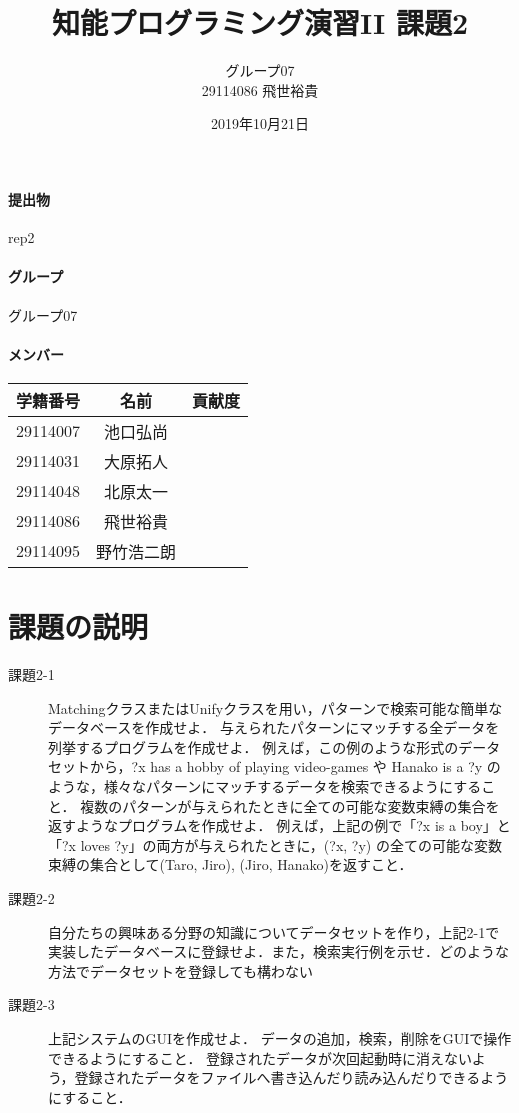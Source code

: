 \documentclass[a4j]{jarticle}
\title{知能プログラミング演習II 課題2}
\author{グループ07\\
  29114086 飛世裕貴\\
}
\date{2019年10月21日}
\begin{document}
\maketitle

\paragraph{提出物} rep2
\paragraph{グループ} グループ07
\paragraph{メンバー}
\begin{tabular}{|c|c|c|}
  \hline\hline
  学籍番号&名前&貢献度\\
  \hline\hline
  29114007&池口弘尚&\\
  \hline
  29114031&大原拓人&\\
  \hline
  29114048&北原太一&\\
  \hline
  29114086&飛世裕貴&\\
  \hline
  29114095&野竹浩二朗&\\
  \hline
\end{tabular}



\section{課題の説明}
\begin{description}
\item[課題2-1] MatchingクラスまたはUnifyクラスを用い，パターンで検索可能な簡単なデータベースを作成せよ．
与えられたパターンにマッチする全データを列挙するプログラムを作成せよ．
例えば，この例のような形式のデータセットから，?x has a hobby of playing video-games や Hanako is a ?y のような，様々なパターンにマッチするデータを検索できるようにすること．
複数のパターンが与えられたときに全ての可能な変数束縛の集合を返すようなプログラムを作成せよ．
例えば，上記の例で「?x is a boy」と「?x loves ?y」の両方が与えられたときに，(?x, ?y) の全ての可能な変数束縛の集合として{(Taro, Jiro), (Jiro, Hanako)}を返すこと．

\item[課題2-2] 自分たちの興味ある分野の知識についてデータセットを作り，上記2-1で実装したデータベースに登録せよ．また，検索実行例を示せ．どのような方法でデータセットを登録しても構わない
\item[課題2-3] 上記システムのGUIを作成せよ．
データの追加，検索，削除をGUIで操作できるようにすること．
登録されたデータが次回起動時に消えないよう，登録されたデータをファイルへ書き込んだり読み込んだりできるようにすること．
\end{description}
\end{document}
